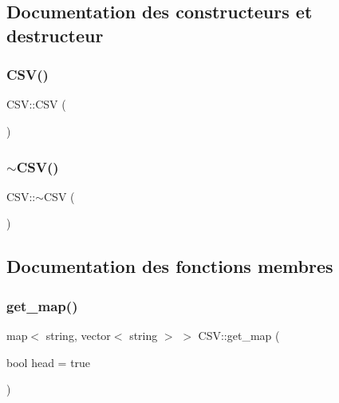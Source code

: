 \subsection{Documentation des constructeurs et destructeur}
\mbox{\label{classCSV_a335bef6309d648d44907c0e7279cc32c}} 
\subsubsection{\texorpdfstring{C\+S\+V()}{CSV()}}
{\footnotesize\ttfamily C\+S\+V\+::\+C\+SV (\begin{DoxyParamCaption}{ }\end{DoxyParamCaption})}

\mbox{\label{classCSV_ae1b0cfd98d62cf81004462320848c665}} 
\subsubsection{\texorpdfstring{$\sim$\+C\+S\+V()}{~CSV()}}
{\footnotesize\ttfamily C\+S\+V\+::$\sim$\+C\+SV (\begin{DoxyParamCaption}{ }\end{DoxyParamCaption})}



\subsection{Documentation des fonctions membres}
\mbox{\label{classCSV_af29150140f6e2ad4a75928fbb1ff23a7}} 
\subsubsection{\texorpdfstring{get\+\_\+map()}{get\_map()}}
{\footnotesize\ttfamily map$<$ string, vector$<$ string $>$ $>$ C\+S\+V\+::get\+\_\+map (\begin{DoxyParamCaption}\item[{bool}]{head = {\ttfamily true} }\end{DoxyParamCaption})}

\mbox{\label{classCSV_a62f788e022970a4e847a8850efa9d75a}} 
